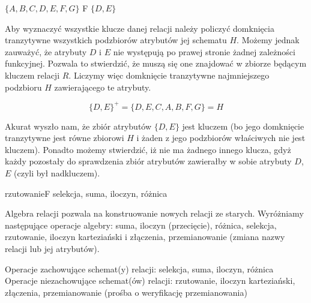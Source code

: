 
{$\{A, B, C, D, E, F, G\}$ }{F}
{$\{D, E\}$}
{\\}

\vspace{0.2cm}
\noindent
Aby wyznaczyć wszystkie klucze danej relacji należy policzyć domknięcia tranzytywne wszystkich podzbiorów atrybutów jej schematu $H$. Możemy jednak zauważyć, że atrybuty $D$ i $E$ nie występują po prawej stronie żadnej zależności funkcyjnej. Pozwala to stwierdzić, że muszą się one znajdować w zbiorze będącym kluczem relacji $R$. Liczymy więc domknięcie tranzytywne najmniejszego podzbioru $H$ zawierającego te atrybuty. 

$$
\{D, E\}^+ = \{D, E, C, A, B, F, G\} = H
$$

\noindent
Akurat wyszło nam, że zbiór atrybutów $\{D, E\}$ jest kluczem (bo jego domknięcie tranzytywne jest równe zbiorowi $H$ i żaden z jego podzbiorów właściwych nie jest kluczem). Ponadto możemy stwierdzić, iż nie ma żadnego innego klucza, gdyż każdy pozostały do sprawdzenia zbiór atrybutów zawierałby w sobie atrybuty $D$, $E$ (czyli był nadkluczem).

{rzutowanie}{F}
{selekcja, suma, iloczyn, różnica}
{\\}

\vspace{0.2cm}
\noindent
Algebra relacji pozwala na konstruowanie nowych relacji ze starych. Wyróżniamy następujące operacje algebry: suma, iloczyn (przecięcie), różnica, selekcja, rzutowanie, iloczyn karteziański i złączenia, przemianowanie (zmiana nazwy relacji lub jej atrybutów).

\vspace{0.2cm}
\noindent
Operacje zachowujące schemat(y) relacji: selekcja, suma, iloczyn, różnica \\
Operacje niezachowujące schemat(ów) relacji: rzutowanie, iloczyn karteziański, złączenia, przemianowanie (prośba o weryfikację przemianowania)



